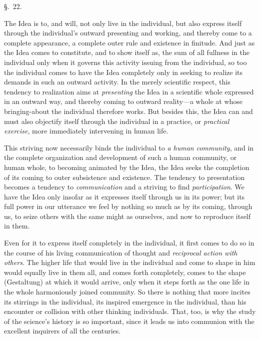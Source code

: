 \documentclass[12pt,a4paper]{book}
\begin{document}
\begin{center}\large\S.~22.\end{center}
The Idea is to, and will, not only live in the individual, but also express itself
through the individual's outward presenting and working, and thereby come to a complete
appearance, a complete outer rule and existence in finitude. And just as the Idea comes
to constitute, and to show itself as, the sum of all fullness in the individual only
when it governs this activity issuing from the individual, so too the individual comes
to have the Idea completely only in seeking to realize its demands in such an outward
activity. In the merely scientific respect, this tendency to realization aims at
\emph{presenting} the Idea in a scientific whole expressed in an outward way, and
thereby coming to outward reality---a whole at whose bringing-about the individual
therefore works. But besides this, the Idea can and must also objectify itself through
the individual in a practice, or \emph{practical exercise}, more immediately intervening
in human life.

This striving now necessarily binds the individual to \emph{a human community}, and in
the complete organization and development of such a human community, or human whole, to
becoming animated by the Idea, the Idea seeks the completion of its coming to outer
subsistence and existence. The tendency to presentation becomes a tendency to
\emph{communication} and a striving to find \emph{participation}. We have the Idea only
insofar as it expresses itself through us in its power; but its full power in our
utterance we feel by nothing so much as by its coming, through us, to seize others with
the same might as ourselves, and now to reproduce itself in them.

Even for it to express
itself completely in the individual, it first comes to do so in the course of his living
communication of thought and \emph{reciprocal action with others}. The higher life that would live in the individual and come to shape in him would equally
live in them all, and comes forth completely, comes to the shape (Gestaltung) at which
it would arrive, only when it steps forth as the one life in the whole harmoniously
joined community. So there is nothing that more incites its stirrings in the individual,
its inspired emergence in the individual, than his encounter or collision with other
thinking individuals. That, too, is why the study of the science's history is so
important, since it leads us into communion with the excellent inquirers of all the
centuries.
\end{document}
